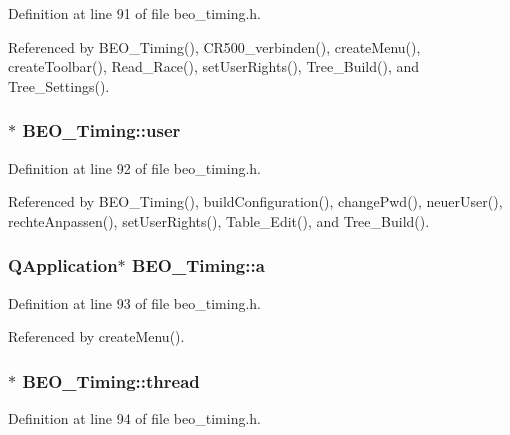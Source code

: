 Definition at line 91 of file beo\_\-timing.h.

Referenced by BEO\_\-Timing(), CR500\_\-verbinden(), createMenu(), createToolbar(), Read\_\-Race(), setUserRights(), Tree\_\-Build(), and Tree\_\-Settings().\hypertarget{class_b_e_o___timing_36f4e79080543317d02636f93b667c27}{
\subsubsection[user]{$\ast$ {\bf BEO\_\-Timing::user}}}
\label{class_b_e_o___timing_36f4e79080543317d02636f93b667c27}




Definition at line 92 of file beo\_\-timing.h.

Referenced by BEO\_\-Timing(), buildConfiguration(), changePwd(), neuerUser(), rechteAnpassen(), setUserRights(), Table\_\-Edit(), and Tree\_\-Build().\hypertarget{class_b_e_o___timing_8d2d841d6eb959c49a406ecebeb3374d}{
\subsubsection[a]{\setlength{\rightskip}{0pt plus 5cm}QApplication$\ast$ {\bf BEO\_\-Timing::a}}}
\label{class_b_e_o___timing_8d2d841d6eb959c49a406ecebeb3374d}




Definition at line 93 of file beo\_\-timing.h.

Referenced by createMenu().\hypertarget{class_b_e_o___timing_3f78ca1ff8e8b783d594c615e1204690}{
\subsubsection[thread]{$\ast$ {\bf BEO\_\-Timing::thread}}}
\label{class_b_e_o___timing_3f78ca1ff8e8b783d594c615e1204690}




Definition at line 94 of file beo\_\-timing.h.

